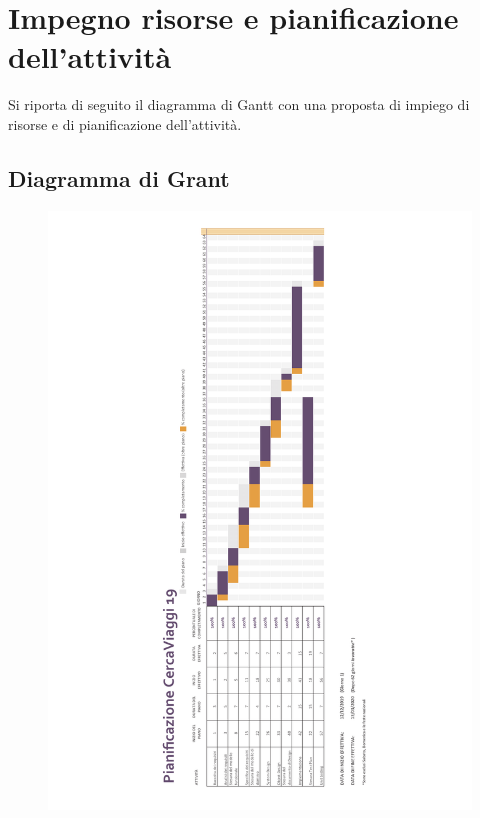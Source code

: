 %
%	 
%

\chapter{Impegno risorse e pianificazione dell'attività}

Si riporta di seguito il diagramma di Gantt con una proposta di impiego di risorse e di pianificazione
dell'attività.

\section{Diagramma di Grant}

\begin{figure}[h]
    \centering
    \includegraphics[scale=1.2, height=\textheight]{DiagammaDiGantt.pdf}
\end{figure}


